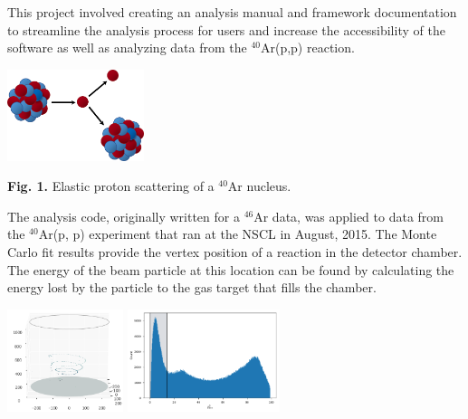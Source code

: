 \documentclass[ansiepaperDNP,portrait]{baposter}
\begin{document}
\begin{poster}
{{This project involved creating an analysis manual and framework documentation to streamline the analysis process for users and increase the accessibility of the software as well as analyzing data from the $^{40}$Ar(p,p) reaction.}

\begin{center}
\includegraphics[width=40mm]{ar40_p.png}
\end{center}

\small{\textbf{Fig. 1.} Elastic proton scattering of a $^{40}$Ar nucleus.}
}
{\small{The analysis code, originally written for a $^{46}$Ar data, was applied to data from the $^{40}$Ar(p, p) experiment that ran at the NSCL in August,  2015.}
\small{The Monte Carlo fit results provide the vertex position of a reaction in the detector chamber. The energy of the beam particle at this location can be found by calculating the energy lost by the particle to the gas target that fills the chamber.}

\begin{center}
\includegraphics[height=30mm]{chamber_plot.png}
\hspace{.75cm}
\includegraphics [height=30mm] {chi2pos.pdf}
\end{center}

}
\end{poster}
\end{document}

